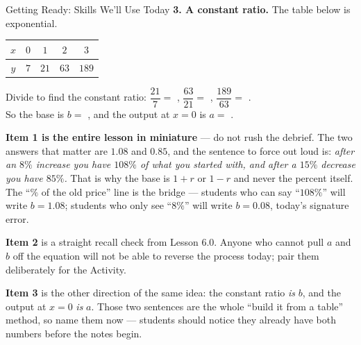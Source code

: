 \documentclass[10pt]{article}
\begin{document}
\begin{notesbox}{Getting Ready: Skills We'll Use Today}
\vspace{2pt}
\textbf{3. A constant ratio.} The table below is exponential.
\begin{center}
\renewcommand{\arraystretch}{1.3}
\begin{tabular}{|c|c|c|c|c|}
\hline
$x$ & $0$ & $1$ & $2$ & $3$ \\ \hline
$y$ & $7$ & $21$ & $63$ & $189$ \\ \hline
\end{tabular}
\end{center}
Divide to find the constant ratio: $\dfrac{21}{7}=$ , \; $\dfrac{63}{21}=$
, \; $\dfrac{189}{63}=$ . \\[3pt]
So the base is $b=$ , and the output at $x=0$ is $a=$ .

\end{notesbox}

\begin{teachernote}
\textbf{Item 1 is the entire lesson in miniature} --- do not rush the debrief. The two answers that
matter are $1.08$ and $0.85$, and the sentence to force out loud is: \emph{after an $8\%$ increase you
have $108\%$ of what you started with, and after a $15\%$ decrease you have $85\%$.} That is why the
base is $1+r$ or $1-r$ and never the percent itself. The ``$\%$ of the old price'' line is the bridge
--- students who can say ``$108\%$'' will write $b=1.08$; students who only see ``$8\%$'' will write
$b=0.08$, today's signature error.

\textbf{Item 2} is a straight recall check from Lesson 6.0. Anyone who cannot pull $a$ and $b$ off the
equation will not be able to reverse the process today; pair them deliberately for the Activity.

\textbf{Item 3} is the other direction of the same idea: the constant ratio \emph{is} $b$, and the
output at $x=0$ \emph{is} $a$. Those two sentences are the whole ``build it from a table'' method, so
name them now --- students should notice they already have both numbers before the notes begin.
\end{teachernote}
\end{document}
